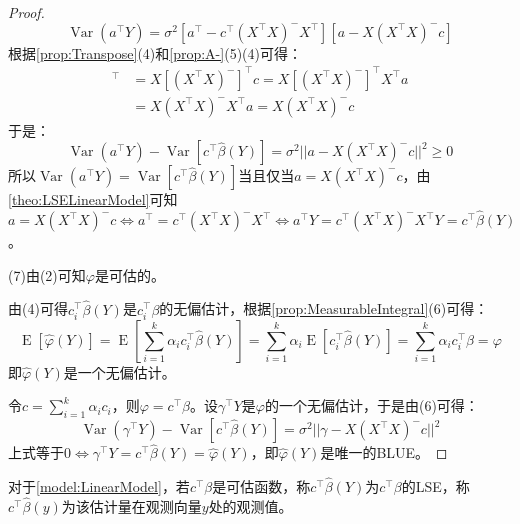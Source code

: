 \begin{proof}
\begin{equation*}
		\operatorname{Var}(a^{\top}Y)=\sigma^2[a^{\top}-c^{\top}(X^{\top}X)^-X^{\top}][a-X(X^{\top}X)^-c]
	\end{equation*}
	根据\cref{prop:Transpose}(4)和\cref{prop:A-}(5)(4)可得：
	\begin{align*}
		[c^{\top}(X^{\top}X)^-X^{\top}]^{\top}&=X[(X^{\top}X)^-]^{\top}c=X[(X^{\top}X)^-]^{\top}X^{\top}a \\
		&=X(X^{\top}X)^-X^{\top}a=X(X^{\top}X)^-c
	\end{align*}
	于是：
	\begin{equation*}
		\operatorname{Var}(a^{\top}Y)-\operatorname{Var}[c^{\top}\hat{\beta}(Y)]=\sigma^2||a-X(X^{\top}X)^-c||^2\geqslant0
	\end{equation*}
	所以$\operatorname{Var}(a^{\top}Y)=\operatorname{Var}[c^{\top}\hat{\beta}(Y)]$当且仅当$a=X(X^{\top}X)^-c$，由\cref{theo:LSELinearModel}可知$a=X(X^{\top}X)^-c\Leftrightarrow a^{\top}=c^{\top}(X^{\top}X)^-X^{\top}\Leftrightarrow a^{\top}Y=c^{\top}(X^{\top}X)^-X^{\top}Y=c^{\top}\hat{\beta}(Y)$。\par
	(7)由(2)可知$\varphi$是可估的。\par
	由(4)可得$c_i^{\top}\hat{\beta}(Y)$是$c_i^{\top}\beta$的无偏估计，根据\cref{prop:MeasurableIntegral}(6)可得：
	\begin{equation*}
		\operatorname{E}[\hat{\varphi}(Y)]=\operatorname{E}\left[\sum_{i=1}^{k}\alpha_ic_i^{\top}\hat{\beta}(Y)\right]=\sum_{i=1}^{k}\alpha_i\operatorname{E}[c_i^{\top}\hat{\beta}(Y)]=\sum_{i=1}^{k}\alpha_ic_i^{\top}\beta=\varphi
	\end{equation*}
	即$\hat{\varphi}(Y)$是一个无偏估计。\par
	令$c=\sum\limits_{i=1}^{k}\alpha_ic_i$，则$\varphi=c^{\top}\beta$。设$\gamma^{\top}Y$是$\varphi$的一个无偏估计，于是由(6)可得：
	\begin{equation*}
		\operatorname{Var}(\gamma^{\top}Y)-\operatorname{Var}[c^{\top}\hat{\beta}(Y)]=\sigma^2||\gamma-X(X^{\top}X)^-c||^2
	\end{equation*}
	上式等于$0\Leftrightarrow \gamma^{\top}Y=c^{\top}\hat{\beta}(Y)=\hat{\varphi}(Y)$，即$\hat{\varphi}(Y)$是唯一的BLUE。
\end{proof}
\begin{definition}
	对于\cref{model:LinearModel}，若$c^{\top}\beta$是可估函数，称$c^{\top}\hat{\beta}(Y)$为$c^{\top}\beta$的LSE，称$c^{\top}\hat{\beta}(y)$为该估计量在观测向量$y$处的观测值。
\end{definition}
